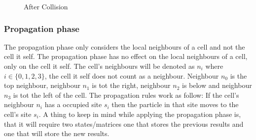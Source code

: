 \documentclass[a4paper,10pt]{article}
\begin{document}
\begin{figure}[H]
\begin{minipage}[width=0.5\linewidth]{0.5\textwidth}
  \caption{After Collision}
  \label{figure:collision_HPP2}
\end{minipage} 
\end{figure}
\subsubsection{Propagation phase}
The propagation phase only considers the local neighbours of a cell and not the cell it self. The propagation phase has no effect on the local neighbours of a cell, only on the cell it self. The cell's neighbours will be denoted as $n_i$ where $i \in \{0, 1, 2, 3\}$, the cell it self does not count as a neighbour. Neighbour $n_0$ is the top neighbour, neighbour $n_1$ is tot the right, neighbour $n_2$ is below and neighbour $n_3$ is tot the left of the cell. The propagation rules work as follow: If the cell's neighbour $n_i$ has a occupied site $s_{i}$ then the particle in that site moves to the cell's
site $s_{i}$.
A thing to keep in mind while applying the propagation phase is, that it will require two states/matrices one that stores the previous results and one that will store the new results.
\end{document}
